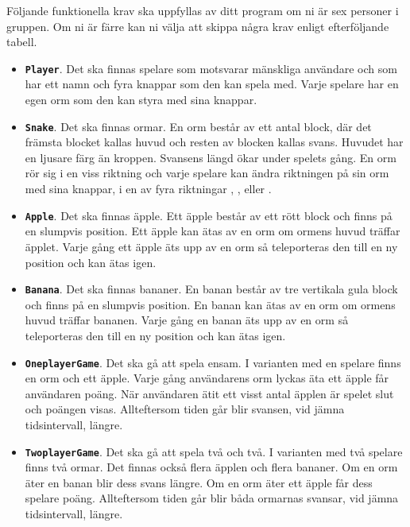 Följande funktionella krav ska uppfyllas av ditt program om ni är sex personer i gruppen. Om ni är färre kan ni välja att skippa några krav enligt efterföljande tabell.
\begin{itemize}[nosep, label={$\square$},]
\item \textbf{\texttt{Player}}. Det ska finnas spelare som motsvarar mänskliga användare och som har ett namn och fyra knappar som den kan spela med. Varje spelare har en egen orm som den kan styra med sina knappar.

\item \textbf{\texttt{Snake}}. Det ska finnas ormar. En orm består av ett antal block, där det främsta blocket kallas huvud och resten av blocken kallas svans. Huvudet har en ljusare färg än kroppen. Svansens längd ökar under spelets gång. En orm rör sig i en viss riktning och varje spelare kan ändra riktningen på sin orm med sina knappar, i en av fyra riktningar , ,  eller .

\item \textbf{\texttt{Apple}}. Det ska finnas äpple. Ett äpple består av ett rött block och finns på en slumpvis position. Ett äpple kan ätas av en orm om ormens huvud träffar äpplet. Varje gång ett äpple äts upp av en orm så teleporteras den till en ny position och kan ätas igen.

\item \textbf{\texttt{Banana}}. Det ska finnas bananer. En banan består av tre vertikala gula block och finns på en slumpvis position. En banan kan ätas av en orm om ormens huvud träffar bananen. Varje gång en banan äts upp av en orm så teleporteras den till en ny position och kan ätas igen.

\item \textbf{\texttt{OneplayerGame}}. Det ska gå att spela ensam. I varianten med en spelare finns en orm och ett äpple. Varje gång användarens orm lyckas äta ett äpple får användaren poäng. När användaren ätit ett visst antal äpplen är spelet slut och poängen visas. Allteftersom tiden går blir svansen, vid jämna tidsintervall, längre.

\item \textbf{\texttt{TwoplayerGame}}. Det ska gå att spela två och två. I varianten med två spelare finns två ormar. Det finnas också flera äpplen och flera bananer. Om en orm äter en banan blir dess svans längre. Om en orm äter ett äpple får dess spelare poäng. Allteftersom tiden går blir båda ormarnas svansar, vid jämna tidsintervall, längre.

\end{itemize}
